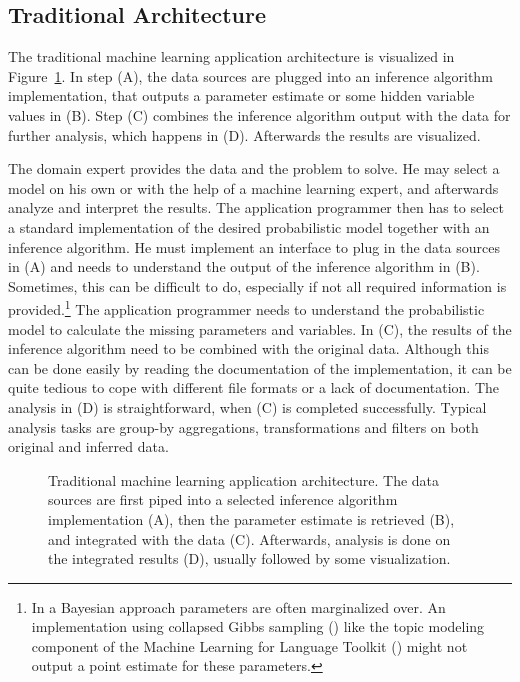 \subsection{Traditional Architecture}

The traditional machine learning application architecture is visualized in Figure~\ref{fig:ml-application-architecture}. In step (A), the data sources are plugged into an inference algorithm implementation, that outputs a parameter estimate or some hidden variable values in (B). Step (C) combines the inference algorithm output with the data for further analysis, which happens in (D). Afterwards the results are visualized.

The domain expert provides the data and the problem to solve. He may select a model on his own or with the help of a machine learning expert, and afterwards analyze and interpret the results. The application programmer then has to select a standard implementation of the desired probabilistic model together with an inference algorithm. He must implement an interface to plug in the data sources in (A) and needs to understand the output of the inference algorithm in (B). Sometimes, this can be difficult to do, especially if not all required information is provided.\footnote{In a Bayesian approach parameters are often marginalized over. An implementation using collapsed Gibbs sampling (\cite{liu1994collapsed}) like the topic modeling component of the Machine Learning for Language Toolkit (\cite{mccallum2002mallet}) might not output a point estimate for these parameters.} The application programmer needs to understand the probabilistic model to calculate the missing parameters and variables. In (C), the results of the inference algorithm need to be combined with the original data. Although this can be done easily by reading the documentation of the implementation, it can be quite tedious to cope with different file formats or a lack of documentation. The analysis in (D) is straightforward, when (C) is completed successfully. Typical analysis tasks are group-by aggregations, transformations and filters on both original and inferred data.

\begin{figure}[t]
\centering
\scalebox{\tikzScale}{\adjustTikzSize }
\caption[Traditional machine learning application architecture]{Traditional machine learning application architecture. The data sources are first piped into a selected inference algorithm implementation (A), then the parameter estimate is retrieved (B), and integrated with the data (C). Afterwards, analysis is done on the integrated results (D), usually followed by some visualization.}\label{fig:ml-application-architecture}
\end{figure}


